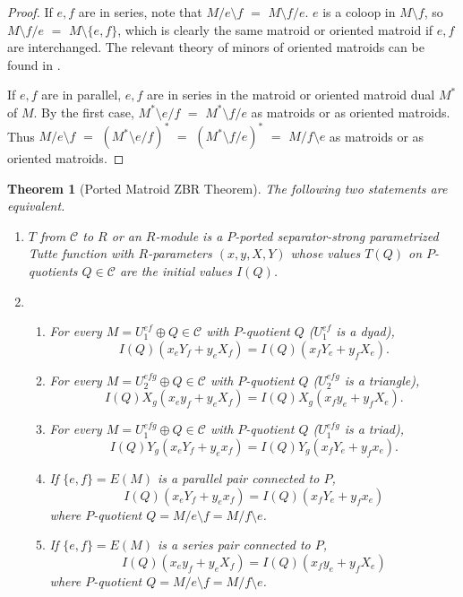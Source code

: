 \documentclass[12pt,leqno]{amsart}
\newtheorem{thm}[lem]{Theorem}
\theoremstyle{remark}
\begin{document}
\begin{proof}
If $e,f$ are in series, note that $M/e\setminus f$ $=$
$M\setminus f/e$.  $e$ is a coloop in $M\setminus f$,
so $M\setminus f/e$ $=$ $M\setminus\{e,f\}$, which is
clearly the same matroid or oriented matroid if $e,f$
are interchanged.  The relevant theory of minors of oriented matroids
can be found in \cite{OMBOOK}.

If $e,f$ are in parallel, $e,f$ are in series in 
the matroid or oriented matroid dual $M^*$ of $M$.
By the first case, $M^*\setminus e/ f$ $=$
$M^*\setminus f/e$ as matroids or as oriented matroids.
Thus $M/e\setminus f$ $=$ $(M^*\setminus e/ f)^*$ $=$
$(M^*\setminus f/ e)^*$ $=$ $M/f\setminus e$ as matroids or
as oriented matroids.
\end{proof}



\begin{thm}[Ported Matroid ZBR Theorem]
\label{BigTheorem}
The following two statements are equivalent.
\begin{enumerate}
\item $T$ from $\mathcal{C}$ to $R$ or an $R$-module is a $P$-ported 
separator-strong parametrized
Tutte function with $R$-parameters $(x, y, X, Y)$ whose values 
$T(Q)$ on $P$-quotients $Q\in\mathcal{C}$ are the initial
values $I(Q)$.
\item
\begin{enumerate}
\item For every $M=U^{ef}_1\oplus Q\in\mathcal{C}$ with 
$P$-quotient $Q$ ($U^{ef}_1$ is a dyad), 
\[
I(Q)(x_e Y_f + y_e X_f) = 
I(Q)(x_f Y_e + y_f X_e).
\]
\item
For every $M=U^{efg}_2\oplus Q\in\mathcal{C}$ with 
$P$-quotient $Q$ ($U^{efg}_2$ is a triangle), 
\[
I(Q)X_g(x_e y_f + y_e X_f) = 
I(Q)X_g(x_f y_e + y_f X_e).
\]
\item
For every $M=U^{efg}_1\oplus Q\in\mathcal{C}$ with 
$P$-quotient $Q$  ($U^{efg}_1$ is a triad), 
\[
I(Q)Y_g(x_e Y_f + y_e x_f) = 
I(Q)Y_g(x_f Y_e + y_f x_e).
\]
\item
If $\{e,f\}=E(M)$ is a parallel pair connected to $P$, 
\[
I(Q)(x_e Y_f + y_e x_f) = 
I(Q)(x_f Y_e + y_f x_e)
\]
where $P$-quotient $Q=M/e\setminus f=M/f\setminus e$.
\item
If $\{e,f\}=E(M)$ is a series pair connected to $P$, 
\[
I(Q)(x_e y_f + y_e X_f) = 
I(Q)(x_f y_e + y_f X_e)
\]
where $P$-quotient $Q=M/e\setminus f=M/f\setminus e$.
\end{enumerate}
\end{enumerate}
\end{thm}
\end{document}

